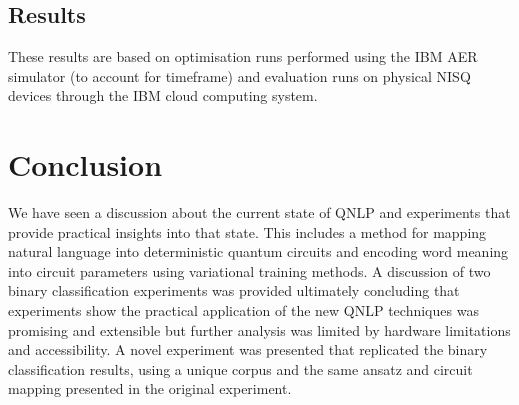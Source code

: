 \documentclass[a4paper,twocolumn,11pt]{quantumarticle}
\begin{document}
    \subsection{Results}\label{subsec:novel-results}
    These results are based on optimisation runs performed using the IBM AER simulator (to account for timeframe)
    and evaluation runs on physical NISQ devices through the IBM cloud computing system.
    \section{Conclusion}\label{sec:conclusion}
    We have seen a discussion about the current state of QNLP and experiments that provide practical insights into that
    state.
    This includes a method for mapping natural language into deterministic quantum circuits and encoding word meaning
    into circuit parameters using variational training methods.
    A discussion of two binary classification experiments was provided ultimately concluding that experiments show the
    practical application of the new QNLP techniques was promising and extensible but further analysis was limited
    by hardware limitations and accessibility.
    A novel experiment was presented that replicated the binary classification results, using a unique corpus and the same
    ansatz and circuit mapping presented in the original experiment.
    
    
\end{document}
